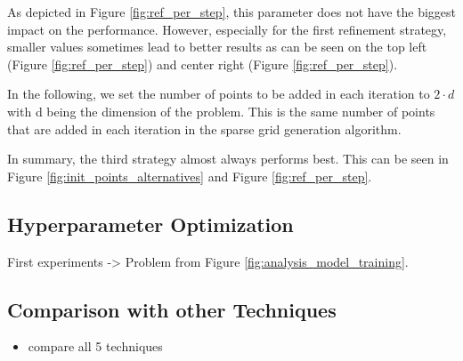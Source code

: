 As depicted in Figure \ref{fig:ref_per_step}, this parameter does not have the biggest impact on the performance. However, especially for the first refinement strategy, smaller values sometimes lead to better results as can be seen on the top left (Figure \ref{fig:ref_per_step}) and center right (Figure \ref{fig:ref_per_step}). \newline 

In the following, we set the number of points to be added in each iteration to $ 2 \cdot d $ with d being the dimension of the problem. This is the same number of points that are added in each iteration in the sparse grid generation algorithm. \newline 

In summary, the third strategy almost always performs best. This can be seen in Figure \ref{fig:init_points_alternatives} and Figure \ref{fig:ref_per_step}. 


\subsection{Hyperparameter Optimization}

First experiments -> Problem from Figure \ref{fig:analysis_model_training}.

\subsection{Comparison with other Techniques}

\begin{itemize}
	\item compare all 5 techniques
\end{itemize}








